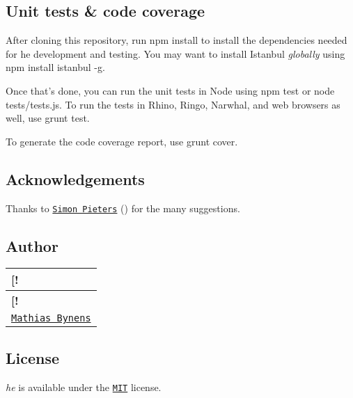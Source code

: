 \subsection*{Unit tests \& code coverage}

After cloning this repository, run {\ttfamily npm install} to install the dependencies needed for he development and testing. You may want to install Istanbul {\itshape globally} using {\ttfamily npm install istanbul -\/g}.

Once that’s done, you can run the unit tests in Node using {\ttfamily npm test} or {\ttfamily node tests/tests.\+js}. To run the tests in Rhino, Ringo, Narwhal, and web browsers as well, use {\ttfamily grunt test}.

To generate the code coverage report, use {\ttfamily grunt cover}.

\subsection*{Acknowledgements}

Thanks to \href{https://simon.html5.org/}{\tt Simon Pieters} (\href{https://twitter.com/zcorpan}{\tt }) for the many suggestions.

\subsection*{Author}

\tabulinesep=1mm
\begin{longtabu} spread 0pt [c]{*{1}{|X[-1]}|}
\hline
\rowcolor{\tableheadbgcolor}\textbf{ \mbox{[}!   }\\
\endfirsthead
\hline
\endfoot
\hline
\rowcolor{\tableheadbgcolor}\textbf{ \mbox{[}!   }\\
\endhead
\href{https://mathiasbynens.be/}{\tt Mathias Bynens}   \\
\end{longtabu}


\subsection*{License}

{\itshape he} is available under the \href{https://mths.be/mit}{\tt M\+IT} license. 